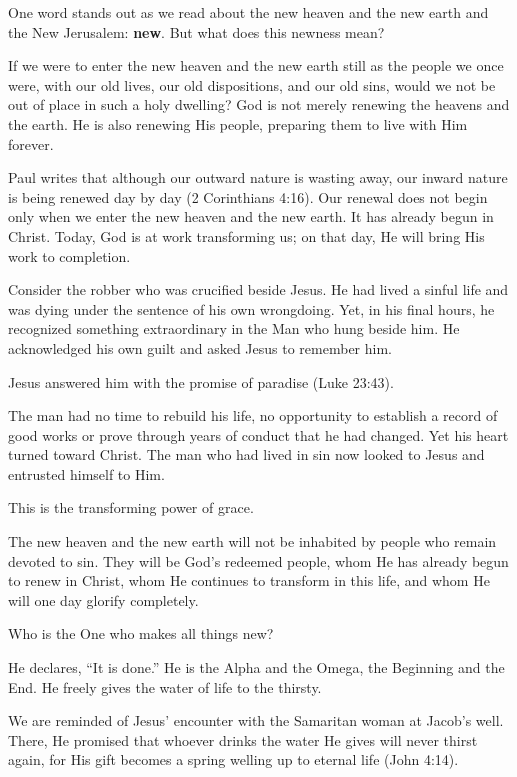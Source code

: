 One word stands out as we read about the new heaven and the new earth and the New Jerusalem: \textbf{new}. But what does this newness mean?

If we were to enter the new heaven and the new earth still as the people we once were, with our old lives, our old dispositions, and our old sins, would we not be out of place in such a holy dwelling? God is not merely renewing the heavens and the earth. He is also renewing His people, preparing them to live with Him forever.

Paul writes that although our outward nature is wasting away, our inward nature is being renewed day by day (2 Corinthians 4:16). Our renewal does not begin only when we enter the new heaven and the new earth. It has already begun in Christ. Today, God is at work transforming us; on that day, He will bring His work to completion.

Consider the robber who was crucified beside Jesus. He had lived a sinful life and was dying under the sentence of his own wrongdoing. Yet, in his final hours, he recognized something extraordinary in the Man who hung beside him. He acknowledged his own guilt and asked Jesus to remember him.

Jesus answered him with the promise of paradise (Luke 23:43).

The man had no time to rebuild his life, no opportunity to establish a record of good works or prove through years of conduct that he had changed. Yet his heart turned toward Christ. The man who had lived in sin now looked to Jesus and entrusted himself to Him.

This is the transforming power of grace.

The new heaven and the new earth will not be inhabited by people who remain devoted to sin. They will be God's redeemed people, whom He has already begun to renew in Christ, whom He continues to transform in this life, and whom He will one day glorify completely.

Who is the One who makes all things new?

He declares, ``It is done.'' He is the Alpha and the Omega, the Beginning and the End. He freely gives the water of life to the thirsty.

We are reminded of Jesus' encounter with the Samaritan woman at Jacob's well. There, He promised that whoever drinks the water He gives will never thirst again, for His gift becomes a spring welling up to eternal life (John 4:14).

